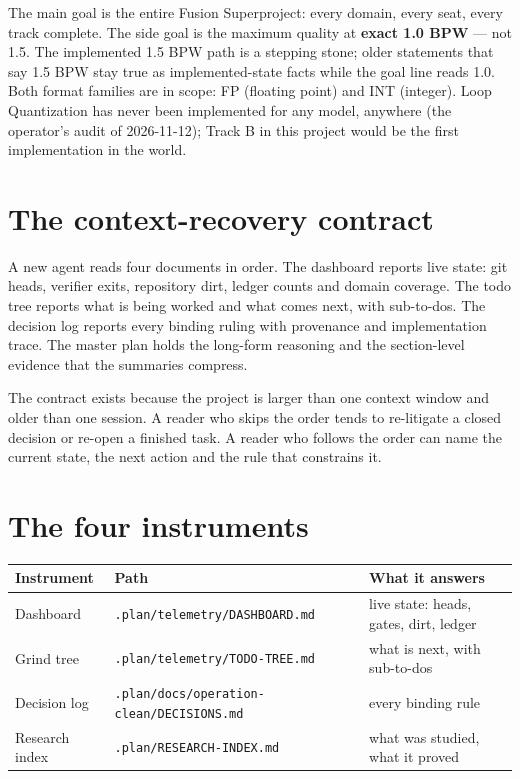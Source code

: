 The main goal is the entire Fusion Superproject: every domain, every seat, every track complete.
The side goal is the maximum quality at \textbf{exact 1.0 BPW} --- not 1.5. The implemented 1.5 BPW
path is a stepping stone; older statements that say 1.5 BPW stay true as implemented-state facts
while the goal line reads 1.0. Both format families are in scope: FP (floating point) and INT
(integer). Loop Quantization has never been implemented for any model, anywhere (the operator's
audit of 2026-11-12); Track B in this project would be the first implementation in the world.

\section{The context-recovery contract}

A new agent reads four documents in order. The dashboard reports live state: git heads, verifier
exits, repository dirt, ledger counts and domain coverage. The todo tree reports what is being
worked and what comes next, with sub-to-dos. The decision log reports every binding ruling with
provenance and implementation trace. The master plan holds the long-form reasoning and the
section-level evidence that the summaries compress.

The contract exists because the project is larger than one context window and older than one
session. A reader who skips the order tends to re-litigate a closed decision or re-open a
finished task. A reader who follows the order can name the current state, the next action and the
rule that constrains it.

\section{The four instruments}

\begin{tabular}{@{}lll@{}}
\toprule
Instrument & Path & What it answers\\
\midrule
Dashboard & \texttt{.plan/telemetry/DASHBOARD.md} & live state: heads, gates, dirt, ledger\\
Grind tree & \texttt{.plan/telemetry/TODO-TREE.md} & what is next, with sub-to-dos\\
Decision log & \texttt{.plan/docs/operation-clean/DECISIONS.md} & every binding rule\\
Research index & \texttt{.plan/RESEARCH-INDEX.md} & what was studied, what it proved\\
\bottomrule
\end{tabular}

